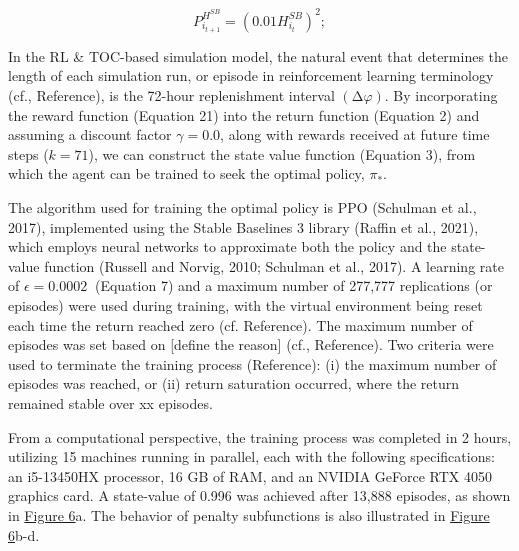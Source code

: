 \begin{equation}
P_{i_{t + 1}}^{H^{SB}} = \left( 0.01H_{i_{t}}^{SB} \right)^{2};
\tag{24}
\end{equation}

In the RL \& TOC-based simulation model, the natural event that
determines the length of each simulation run, or episode in
reinforcement learning terminology (\colorbox{yellow!40}{cf., Reference}), is the
\colorbox{yellow!40}{72}-hour replenishment interval \((\mathrm{\Delta}\varphi)\). By
incorporating the reward function (Equation 21) into the return function
(Equation 2) and assuming a discount factor \(\gamma = 0.0\), along with
rewards received at future time steps (\(k = 71\)), we can construct the
state value function (Equation 3), from which the agent can be trained
to seek the optimal policy, \(\pi_{*}\).

The algorithm used for training the optimal policy is PPO (\colorbox{yellow!40}{Schulman
et al., 2017}), implemented using the Stable Baselines 3 library
(\colorbox{yellow!40}{Raffin et al., 2021}), which employs neural networks to approximate
both the policy and the state-value function (\colorbox{yellow!40}{Russell and Norvig,
2010; Schulman et al., 2017}). A learning rate of
\(\epsilon = 0.0002\ \) (Equation 7) and a maximum number of 277,777
replications (or episodes) were used during training, with the virtual
environment being reset each time the return reached zero (\colorbox{yellow!40}{cf.
Reference}). The maximum number of episodes was set based on
{[}\colorbox{yellow!40}{define the reason}{]} (\colorbox{yellow!40}{cf., Reference}). Two criteria were
used to terminate the training process (\colorbox{yellow!40}{Reference}): (i) the maximum
number of episodes was reached, or (ii) return saturation occurred,
where the return remained stable over \colorbox{yellow!40}{xx} episodes.

From a computational perspective, the training process was completed in
2 hours, utilizing 15 machines running in parallel, each with the
following specifications: an i5-13450HX processor, 16 GB of RAM, and an
NVIDIA GeForce RTX 4050 graphics card. A \colorbox{yellow!40}{state-value of 0.996} was
achieved after 13,888 episodes, as shown in
\colorbox{yellow!40}{\hyperref[_Ref187516969]{Figure 6}}a. The behavior of penalty
subfunctions is also illustrated in \colorbox{yellow!40}{\hyperref[_Ref187516969]{Figure
6}}b-d.

